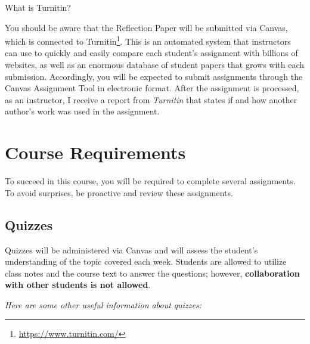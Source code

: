 \documentclass[
  letterpaper,
  DIV=11,
  numbers=noendperiod]{scrartcl}
\DeclareRobustCommand{\href}[2]{#2\footnote{\url{#1}}}
\begin{document}
What is Turnitin?

You should be aware that the Reflection Paper will be submitted via
Canvas, which is connected to
\href{https://www.turnitin.com/}{Turnitin}. This is an automated system
that instructors can use to quickly and easily compare each student's
assignment with billions of websites, as well as an enormous database of
student papers that grows with each submission. Accordingly, you will be
expected to submit assignments through the Canvas Assignment Tool in
electronic format. After the assignment is processed, as an instructor,
I receive a report from \emph{Turnitin} that states if and how another
author's work was used in the assignment.

\hypertarget{course-requirements}{%
\section{Course Requirements}\label{course-requirements}}

To succeed in this course, you will be required to complete several
assignments. To avoid surprises, be proactive and review these
assignments.

\hypertarget{quizzes}{%
\subsection{Quizzes}\label{quizzes}}

Quizzes will be administered via Canvas and will assess the student's
understanding of the topic covered each week. Students are allowed to
utilize class notes and the course text to answer the questions;
however, \textbf{collaboration with other students is not allowed}.

\emph{Here are some other useful information about quizzes:}
\end{document}
